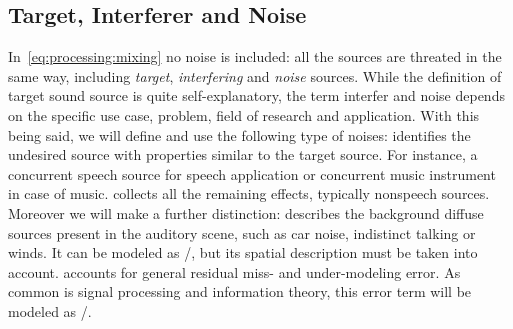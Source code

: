 \subsection{Target, Interferer and Noise}
In~\cref{eq:processing:mixing} no noise is included:
all the sources are threated in the same way, including \textit{target}, \textit{interfering} and \textit{noise} sources.
While the definition of target sound source is quite self-explanatory,
the term interfer and noise depends on the specific use case, problem, field of research and application.
With this being said, we will define and use the following type of noises:
 identifies the undesired source with properties similar to the target source.
For instance, a concurrent speech source for speech application or concurrent music instrument in case of music.
 collects all the remaining effects, typically nonspeech sources. Moreover we will make a further distinction:
 describes the background diffuse sources present in the auditory scene, such as car noise, indistinct talking or winds.
It can be modeled as \AWGNdef/, but its spatial description must be taken into account.
 accounts for general residual miss- and under-modeling error.
As common is signal processing and information theory, this error term will be modeled as \AWGN/.

